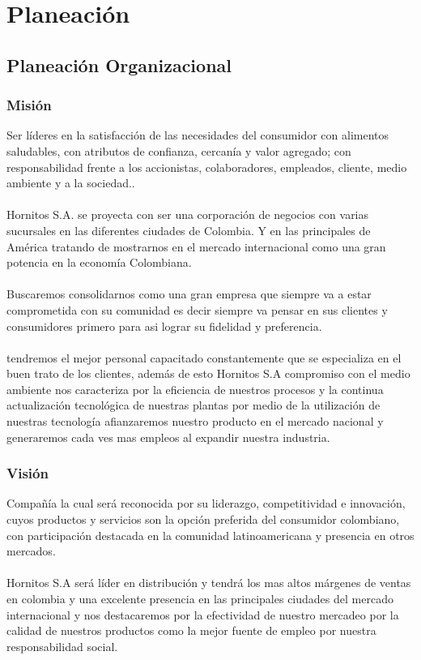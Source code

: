 \chapter{Planeaci\'on}
\section{Planeaci\'on Organizacional}
\subsection{Misi\'on}
Ser l\'ideres en la satisfacci\'on de las necesidades del consumidor con alimentos saludables, con atributos de confianza, cercan\'ia y valor agregado; con responsabilidad frente a los accionistas, colaboradores, empleados, cliente, medio ambiente y a la sociedad..%
\\%
\\%
Hornitos S.A. se proyecta con ser  una corporaci\'on de negocios con varias sucursales en las diferentes ciudades de  Colombia. Y en las principales de Am\'erica tratando de mostrarnos en el mercado internacional como una gran potencia en la econom\'ia Colombiana.
\\%
\\%
Buscaremos consolidarnos como una gran empresa que siempre va a estar comprometida con su comunidad es decir siempre va pensar en sus clientes y consumidores primero para asi lograr su fidelidad y preferencia.
\\%
\\%
tendremos el mejor personal capacitado constantemente que se especializa en el buen trato de los clientes, adem\'as de esto Hornitos S.A compromiso con el medio ambiente nos caracteriza por la eficiencia de nuestros procesos y la continua actualizaci\'on tecnol\'ogica de nuestras plantas por medio de la utilizaci\'on de nuestras tecnolog\'ia afianzaremos nuestro producto en el mercado nacional y generaremos cada ves mas empleos al expandir nuestra industria.
%
\subsection{Visi\'on}
Compa\~n\'ia la cual ser\'a reconocida por su liderazgo, competitividad e innovaci\'on, cuyos productos y servicios son la opci\'on preferida del consumidor colombiano, con participaci\'on destacada en la comunidad latinoamericana y presencia en otros mercados.
\\%
\\%
Hornitos S.A ser\'a l\'ider en distribuci\'on y tendr\'a los mas altos m\'argenes de ventas en colombia y una excelente presencia en las principales ciudades del mercado internacional y nos destacaremos por la efectividad de nuestro mercadeo por la calidad de nuestros productos como la mejor fuente de empleo por nuestra responsabilidad social.

